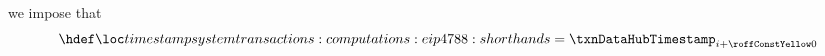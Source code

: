 \item[\underline{\underline{Setting the time stamp}}]
	we impose that
	\[
		\locLineaTimestamp
		=
		\txnDataHubTimestamp _{i + \hubViewRowOffset}
	\]
